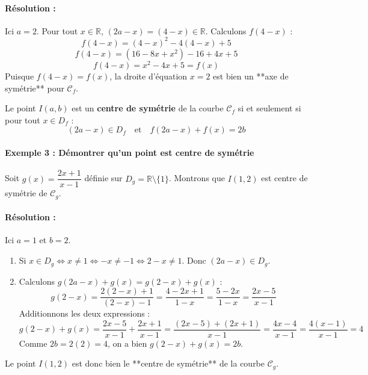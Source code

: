 \documentclass[12pt,a4paper]{article}
\begin{document}
\paragraph{Résolution :}
Ici $a = 2$. Pour tout $x \in \mathbb{R}$, $(2a - x) = (4 - x) \in \mathbb{R}$.
Calculons $f(4 - x)$ :
\[
f(4 - x) = (4 - x)^2 - 4(4 - x) + 5
\]
\[
f(4 - x) = (16 - 8x + x^2) - 16 + 4x + 5
\]
\[
f(4 - x) = x^2 - 4x + 5 = f(x)
\]
Puisque $f(4 - x) = f(x)$, la droite d'équation $x = 2$ est bien un **axe de symétrie** pour $\mathcal{C}_f$.

\vspace{0.3cm}

\begin{tcolorbox}[colback=gray!5!white,colframe=black,title=\textbf{Propriété 2 : Centre de symétrie}]
Le point $I(a, b)$ est un \textbf{centre de symétrie} de la courbe $\mathcal{C}_f$ si et seulement si pour tout $x \in D_f$ :
\[
(2a - x) \in D_f \quad \text{et} \quad f(2a - x) + f(x) = 2b
\]
\end{tcolorbox}

\paragraph{Exemple 3 : Démontrer qu'un point est centre de symétrie}
Soit $g(x) = \dfrac{2x + 1}{x - 1}$ définie sur $D_g = \mathbb{R} \setminus \{1\}$. Montrons que $I(1, 2)$ est centre de symétrie de $\mathcal{C}_g$.

\paragraph{Résolution :}
Ici $a = 1$ et $b = 2$.
\begin{enumerate}
    \item Si $x \in D_g \iff x \neq 1 \iff -x \neq -1 \iff 2 - x \neq 1$. Donc $(2a - x) \in D_g$.
    \item Calculons $g(2a - x) + g(x) = g(2 - x) + g(x)$ :
    \[
    g(2 - x) = \frac{2(2 - x) + 1}{(2 - x) - 1} = \frac{4 - 2x + 1}{1 - x} = \frac{5 - 2x}{1 - x} = \frac{2x - 5}{x - 1}
    \]
    Additionnons les deux expressions :
    \[
    g(2 - x) + g(x) = \frac{2x - 5}{x - 1} + \frac{2x + 1}{x - 1} = \frac{(2x - 5) + (2x + 1)}{x - 1} = \frac{4x - 4}{x - 1} = \frac{4(x - 1)}{x - 1} = 4
    \]
    Comme $2b = 2(2) = 4$, on a bien $g(2 - x) + g(x) = 2b$.
\end{enumerate}
Le point $I(1, 2)$ est donc bien le **centre de symétrie** de la courbe $\mathcal{C}_g$.
\end{document}
